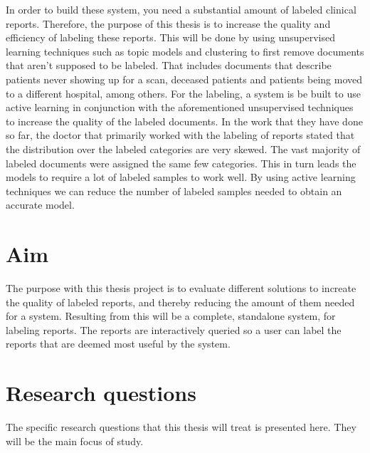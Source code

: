 In order to build these system, you need a substantial amount of labeled clinical reports.
Therefore, the purpose of this thesis is to increase the quality and efficiency of labeling these reports.
This will be done by using unsupervised learning techniques such as topic models and clustering to first remove documents that aren't supposed to be labeled.
That includes documents that describe patients never showing up for a scan, deceased patients and patients being moved to a different hospital, among others.
For the labeling, a system is be built to use active learning in conjunction with the aforementioned unsupervised techniques to increase the quality of the labeled documents.
In the work that they have done so far, the doctor that primarily worked with the labeling of reports stated that the distribution over the labeled categories are very skewed.
The vast majority of labeled documents were assigned the same few categories.
This in turn leads the models to require a lot of labeled samples to work well.
By using active learning techniques we can reduce the number of labeled samples needed to obtain an accurate model.

\section{Aim}
\label{sec:aim}

The purpose with this thesis project is to evaluate different solutions to increate the quality of labeled reports, and thereby reducing the amount of them needed for a system.
Resulting from this will be a complete, standalone system, for labeling reports.
The reports are interactively queried so a user can label the reports that are deemed most useful by the system.

\section{Research questions}
\label{sec:research-questions}

The specific research questions that this thesis will treat is presented here.
They will be the main focus of study.

